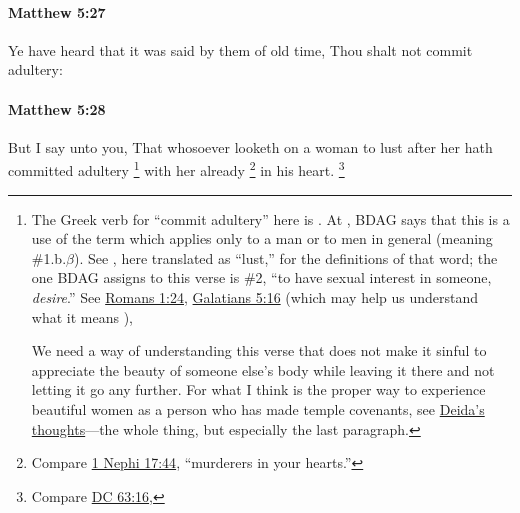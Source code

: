 		\paragraph{Matthew 5:27} %
			\label{MATTHEW-5-27}

			Ye have heard that it was said by them of old time, Thou shalt not commit adultery:

			\begin{framed}
			\scriptsize
				\begin{compactdesc}
					\item[SBLG] 
				\end{compactdesc}
			\end{framed}

		\paragraph{Matthew 5:28} %
			\label{MATTHEW-5-28}

			But I say unto you, That whosoever looketh on a woman to lust after her hath committed adultery%
				\footnote{%
					The Greek verb for ``commit adultery'' here is . At \hyperref[MOICHEUO]{}, BDAG says that this is a use of the term which applies only to a man or to men in general (meaning \#1.b.$\beta$). See \hyperref[EPITHUMEO]{}, here translated as ``lust,'' for the definitions of that word; the one BDAG assigns to this verse is \#2, ``to have sexual interest in someone, \textit{desire}.'' See \hyperref[ROMANS-1-24]{Romans 1:24}, \hyperref[GALATIANS-5-16]{Galatians 5:16} (which may help us understand what it means ),
					
					We need a way of understanding this verse that does not make it sinful to appreciate the beauty of someone else's body while leaving it there and not letting it go any further. For what I think is the proper way to experience beautiful women as a person who has made temple covenants, see \hyperref[TTW-WOMEN-OTHERS-0001]{Deida's thoughts}---the whole thing, but especially the last paragraph.
				}
			with her already
				\footnote{%
					Compare \hyperref[1NEPHI-17-44]{1 Nephi 17:44}, ``murderers in your hearts.''
					}%
			in his heart.%
				\footnote{%
					Compare \hyperref[DC63-16]{DC 63:16},
					}


